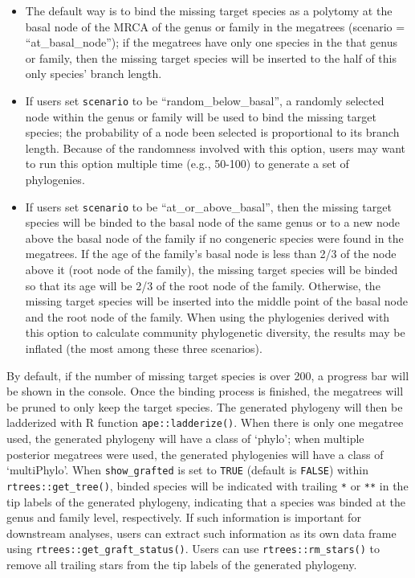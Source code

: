 \documentclass[
  12pt,
]{article}
\providecommand{\tightlist}{%
  \setlength{\itemsep}{0pt}\setlength{\parskip}{0pt}}
\begin{document}
\begin{itemize}
\tightlist
\item
  The default way is to bind the missing target species as a polytomy at the basal node of the MRCA of the genus or family in the megatrees (scenario = ``at\_basal\_node''); if the megatrees have only one species in the that genus or family, then the missing target species will be inserted to the half of this only species' branch length.
\item
  If users set \texttt{scenario} to be ``random\_below\_basal'', a randomly selected node within the genus or family will be used to bind the missing target species; the probability of a node been selected is proportional to its branch length. Because of the randomness involved with this option, users may want to run this option multiple time (e.g., 50-100) to generate a set of phylogenies.
\item
  If users set \texttt{scenario} to be ``at\_or\_above\_basal'', then the missing target species will be binded to the basal node of the same genus or to a new node above the basal node of the family if no congeneric species were found in the megatrees. If the age of the family's basal node is less than 2/3 of the node above it (root node of the family), the missing target species will be binded so that its age will be 2/3 of the root node of the family. Otherwise, the missing target species will be inserted into the middle point of the basal node and the root node of the family. When using the phylogenies derived with this option to calculate community phylogenetic diversity, the results may be inflated (the most among these three scenarios).
\end{itemize}

By default, if the number of missing target species is over 200, a progress bar will be shown in the console. Once the binding process is finished, the megatrees will be pruned to only keep the target species. The generated phylogeny will then be ladderized with R function \texttt{ape::ladderize()}. When there is only one megatree used, the generated phylogeny will have a class of `phylo'; when multiple posterior megatrees were used, the generated phylogenies will have a class of `multiPhylo'. When \texttt{show\_grafted} is set to \texttt{TRUE} (default is \texttt{FALSE}) within \texttt{rtrees::get\_tree()}, binded species will be indicated with trailing \texttt{*} or \texttt{**} in the tip labels of the generated phylogeny, indicating that a species was binded at the genus and family level, respectively. If such information is important for downstream analyses, users can extract such information as its own data frame using \texttt{rtrees::get\_graft\_status()}. Users can use \texttt{rtrees::rm\_stars()} to remove all trailing stars from the tip labels of the generated phylogeny.
\end{document}
